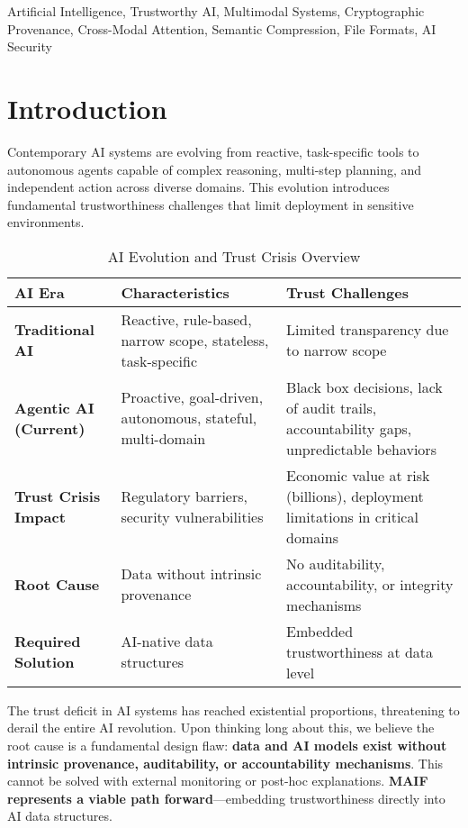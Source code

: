 \documentclass[conference]{IEEEtran}
\begin{document}
\begin{IEEEkeywords}
Artificial Intelligence, Trustworthy AI, Multimodal Systems, Cryptographic Provenance, Cross-Modal Attention, Semantic Compression, File Formats, AI Security
\end{IEEEkeywords}

\section{Introduction}

Contemporary AI systems are evolving from reactive, task-specific tools to autonomous agents capable of complex reasoning, multi-step planning, and independent action across diverse domains. This evolution introduces fundamental trustworthiness challenges that limit deployment in sensitive environments.

\begin{table*}[!t]
\renewcommand{\arraystretch}{1.3}
\caption{AI Evolution and Trust Crisis Overview}
\label{tab:ai-evolution-crisis}
\centering
\footnotesize
\begin{tabular}{p{3cm}p{5cm}p{6cm}}
\toprule
\textbf{AI Era} & \textbf{Characteristics} & \textbf{Trust Challenges} \\
\midrule
\textbf{Traditional AI} & Reactive, rule-based, narrow scope, stateless, task-specific & Limited transparency due to narrow scope \\
\textbf{Agentic AI (Current)} & Proactive, goal-driven, autonomous, stateful, multi-domain & Black box decisions, lack of audit trails, accountability gaps, unpredictable behaviors \\
\textbf{Trust Crisis Impact} & Regulatory barriers, security vulnerabilities & Economic value at risk (billions), deployment limitations in critical domains \\
\textbf{Root Cause} & Data without intrinsic provenance & No auditability, accountability, or integrity mechanisms \\
\textbf{Required Solution} & AI-native data structures & Embedded trustworthiness at data level \\
\bottomrule
\end{tabular}
\end{table*}

The trust deficit in AI systems has reached existential proportions, threatening to derail the entire AI revolution. Upon thinking long about this, we believe the root cause is a fundamental design flaw: \textbf{data and AI models exist without intrinsic provenance, auditability, or accountability mechanisms}. This cannot be solved with external monitoring or post-hoc explanations. \textbf{MAIF represents a viable path forward}—embedding trustworthiness directly into AI data structures.
\end{document}
